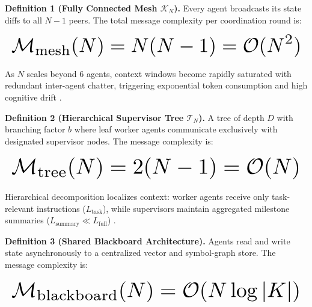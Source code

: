\documentclass[10pt,twocolumn,letterpaper]{article}
\begin{document}
\textbf{Definition 1 (Fully Connected Mesh $\mathcal{K}_N$).} Every agent broadcasts its state diffs to all $N-1$ peers. The total message complexity per coordination round is:








\begin{equation}
\resizebox{\columnwidth}{!}{$\displaystyle
\begin{aligned}
\mathcal{M}_{\text{mesh}}(N) = N(N - 1) = \mathcal{O}(N^2)
\end{aligned}
$}
\end{equation}








As $N$ scales beyond 6 agents, context windows become rapidly saturated with redundant inter-agent chatter, triggering exponential token consumption and high cognitive drift \cite{arxiv_2412_06333}.

\textbf{Definition 2 (Hierarchical Supervisor Tree $\mathcal{T}_N$).} A tree of depth $D$ with branching factor $b$ where leaf worker agents communicate exclusively with designated supervisor nodes. The message complexity is:








\begin{equation}
\resizebox{\columnwidth}{!}{$\displaystyle
\begin{aligned}
\mathcal{M}_{\text{tree}}(N) = 2(N - 1) = \mathcal{O}(N)
\end{aligned}
$}
\end{equation}








Hierarchical decomposition localizes context: worker agents receive only task-relevant instructions ($L_{\text{task}}$), while supervisors maintain aggregated milestone summaries ($L_{\text{summary}} \ll L_{\text{full}}$) \cite{arxiv_2406_00584}.

\textbf{Definition 3 (Shared Blackboard Architecture).} Agents read and write state asynchronously to a centralized vector and symbol-graph store. The message complexity is:








\begin{equation}
\resizebox{\columnwidth}{!}{$\displaystyle
\begin{aligned}
\mathcal{M}_{\text{blackboard}}(N) = \mathcal{O}(N \log |K|)
\end{aligned}
$}
\end{equation}
\end{document}
